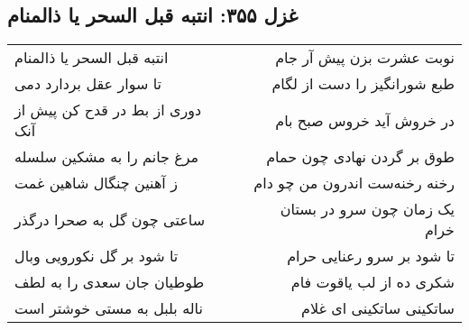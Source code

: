 \begin{center}
\section*{غزل ۳۵۵: انتبه قبل السحر یا ذالمنام}
\label{sec:355}
\begin{longtable}{l p{0.5cm} r}
انتبه قبل السحر یا ذالمنام
&&
نوبت عشرت بزن پیش آر جام
\\
تا سوار عقل بردارد دمی
&&
طبع شورانگیز را دست از لگام
\\
دوری از بط در قدح کن پیش از آنک
&&
در خروش آید خروس صبح بام
\\
مرغ جانم را به مشکین سلسله
&&
طوق بر گردن نهادی چون حمام
\\
ز آهنین چنگال شاهین غمت
&&
رخنه رخنه‌ست اندرون من چو دام
\\
ساعتی چون گل به صحرا درگذر
&&
یک زمان چون سرو در بستان خرام
\\
تا شود بر گل نکورویی وبال
&&
تا شود بر سرو رعنایی حرام
\\
طوطیان جان سعدی را به لطف
&&
شکری ده از لب یاقوت فام
\\
ناله بلبل به مستی خوشتر است
&&
ساتکینی ساتکینی ای غلام
\\
\end{longtable}
\end{center}
